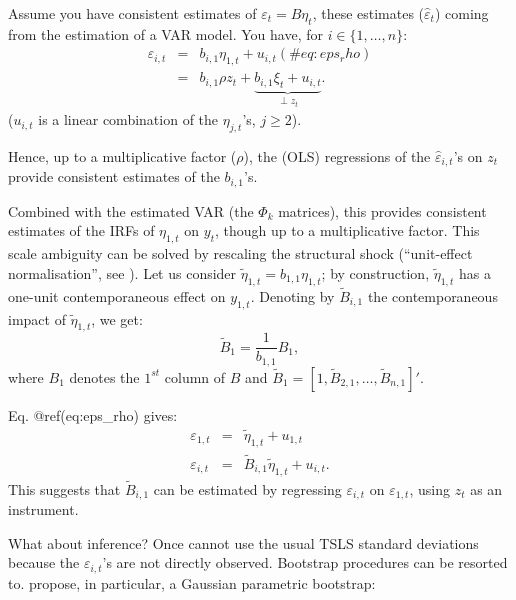 \documentclass[
  12pt,
]{book}
\theoremstyle{definition}
\theoremstyle{definition}
\theoremstyle{definition}
\theoremstyle{definition}
\theoremstyle{remark}
\begin{document}
Assume you have consistent estimates of \(\varepsilon_t = B\eta_t\), these estimates (\(\hat\varepsilon_{t}\)) coming from the estimation of a VAR model. You have, for \(i \in \{1,\dots,n\}\):
\begin{eqnarray}
\varepsilon_{i,t} &=& b_{i,1} \eta_{1,t} + u_{i,t} (\#eq:eps_rho)\\
&=& b_{i,1} \rho z_t + \underbrace{b_{i,1}\xi_t + u_{i,t}}_{\perp z_t}. \nonumber
\end{eqnarray}
(\(u_{i,t}\) is a linear combination of the \(\eta_{j,t}\)'s, \(j\ge2\)).

Hence, up to a multiplicative factor (\(\rho\)), the (OLS) regressions of the \(\hat\varepsilon_{i,t}\)'s on \(z_t\) provide consistent estimates of the \(b_{i,1}\)'s.

Combined with the estimated VAR (the \(\Phi_k\) matrices), this provides consistent estimates of the IRFs of \(\eta_{1,t}\) on \(y_t\), though up to a multiplicative factor. This scale ambiguity can be solved by rescaling the structural shock (``unit-effect normalisation'', see \citet{Stock_Watson_2018}). Let us consider \(\tilde\eta_{1,t}=b_{1,1}\eta_{1,t}\); by construction, \(\tilde\eta_{1,t}\) has a one-unit contemporaneous effect on \(y_{1,t}\). Denoting by \(\tilde{B}_{i,1}\) the contemporaneous impact of \(\tilde\eta_{1,t}\), we get:
\[
\tilde{B}_{1} = \frac{1}{b_{1,1}} {B}_{1},
\]
where \(B_{1}\) denotes the \(1^{st}\) column of \(B\) and \(\tilde{B}_{1}=[1,\tilde{B}_{2,1},\dots,\tilde{B}_{n,1}]'\).

Eq. @ref(eq:eps\_rho) gives:
\begin{eqnarray*}
\varepsilon_{1,t} &=& \tilde\eta_{1,t} + u_{1,t}\\
\varepsilon_{i,t} &=& \tilde{B}_{i,1} \tilde\eta_{1,t} + u_{i,t}.
\end{eqnarray*}
This suggests that \(\tilde{B}_{i,1}\) can be estimated by regressing \(\varepsilon_{i,t}\) on \(\varepsilon_{1,t}\), using \(z_t\) as an instrument.

What about inference? Once cannot use the usual TSLS standard deviations because the \(\varepsilon_{i,t}\)'s are not directly observed. Bootstrap procedures can be resorted to. \citet{Stock_Watson_2018} propose, in particular, a Gaussian parametric bootstrap:
\end{document}
